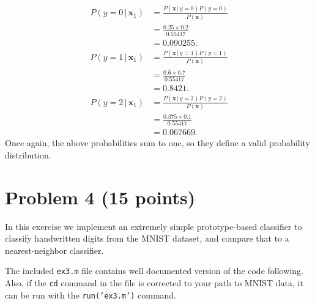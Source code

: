 \documentclass[10pt]{article}
\begin{document}
\begin{align*}
   P(y = 0 \, | \, \textbf{x}_1) &= \frac{P(\textbf{x} \, | \, y = 0)P(y = 0)}{P(\textbf{x})} \\
                                             &= \frac{0.25 \times 0.2}{0.55417} \\
                                             &= 0.090255. \\
   P(y = 1 \, | \, \textbf{x}_1) &= \frac{P(\textbf{x} \, | \, y = 1)P(y = 1)}{P(\textbf{x})} \\
                                             &= \frac{0.\bar{6} \times 0.7}{0.55417} \\
                                             &= 0.8421. \\
   P(y = 2 \, | \, \textbf{x}_1) &= \frac{P(\textbf{x} \, | \, y = 2)P(y = 2)}{P(\textbf{x})} \\
                                             &= \frac{0.375 \times 0.1}{0.55417} \\
                                             &= 0.067669. 
\end{align*}
Once again, the above probabilities sum to one, so they define a valid probability distribution.

\color{blue}
\section*{Problem 4 (15 points)}
In this exercise we implement an extremely simple prototype-based classifier to classify handwritten digits from the MNIST dataset, and compare that to a nearest-neighbor classifier.

\color{black}
The included \texttt{ex3.m} file contains well documented version of the code following. Also, if the \texttt{cd} command in the file is corrected to your path to MNIST data, it can be run with the \texttt{run('ex3.m')} command.

\color{blue}
\end{document}
